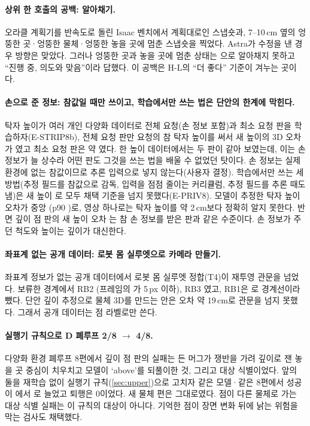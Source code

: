 \paragraph{상위 한 호출의 공백: 알아채기.} 오라클 계획기를 반속도로 돌린 Isaac 벤치에서 계획대로인 스냅숏과, 7--10\,cm 옆의 엉뚱한 곳·엉뚱한 물체·엉뚱한 놓을 곳에 멈춘 스냅숏을 찍었다. Astra가 수정을 낸 경우 방향은  맞았다. 그러나 엉뚱한 곳과 놓을 곳에 멈춘 상태는 으로 알아채지 못하고 ``진행 중, 의도와 맞음''이라 답했다. 이 공백은 H-L의 ``더 좋다'' 기준이 겨누는 곳이다.

\paragraph{손으로 준 정보: 참값일 때만 쓰이고, 학습에서만 쓰는 법은 단안의 한계에 막힌다.} 탁자 높이가 여러 개인 다양화 데이터로 전체 요청(손 정보 포함)과 최소 요청 판을 학습하자(E-STRIP8b), 전체 요청 판만 요청의 참 탁자 높이를 써서 새 높이의 3D 오차가 였고 최소 요청 판은 약 였다. 한 높이 데이터에서는 두 판이 같아 보였는데, 이는 손 정보가 늘 상수라 어떤 판도 그것을 쓰는 법을 배울 수 없었던 탓이다. 손 정보는 실제 환경에 없는 참값이므로 추론 입력으로 넣지 않는다(사용자 결정). 학습에서만 쓰는 세 방법(추정 필드를 참값으로 감독, 입력을 점점 줄이는 커리큘럼, 추정 필드를 추론 때도 냄)은 새 높이 로 모두 채택 기준을 넘지 못했다(E-PRIV8). 모델이 추정한 탁자 높이 오차가 중앙 (p90 )로, 영상 하나로는 탁자 높이를 약 2\,cm보다 정확히 알지 못한다. 반면 깊이 점 판의 새 높이 오차 는 참 손 정보를 받은 판과 같은 수준이다. 손 정보가 주던 척도와 높이는 깊이가 대신한다.

\paragraph{좌표계 없는 공개 데이터: 로봇 몸 실루엣으로 카메라 만들기.} 좌표계 정보가 없는 공개 데이터에서 로봇 몸 실루엣 정합(T4)이 재투영 관문을 넘었다. 보류한 경계에서 RB2 (프레임의 가 5\,px 이하), RB3 였고, RB1은 로 경계선이라 뺐다. 단안 깊이 추정으로 물체 3D를 만드는 안은 오차 약 19\,cm로 관문을 넘지 못했다. 그래서 공개 데이터는 점 라벨로만 쓴다.

\paragraph{실행기 규칙으로 D 폐루프 2/8 $\rightarrow$ 4/8.} 다양화 환경 폐루프 8편에서 깊이 점 판의 실패는 든 머그가 쟁반을 가려 깊이로 잰 놓을 곳 중심이 치우치고 모델이 `above'를 되풀이한 것, 그리고 대상 식별이었다. 앞의 둘을 재학습 없이 실행기 규칙(\cref{sec:upper})으로 고치자 같은 모델·같은 8편에서 성공이 에서 로 늘었고 퇴행은 0이었다. 새 물체 편은  그대로였다. 점이 다른 물체로 가는 대상 식별 실패는 이 규칙의 대상이 아니다. 기억한 점이 장면 변화 뒤에 낡는 위험을 막는 검사도 채택했다.

